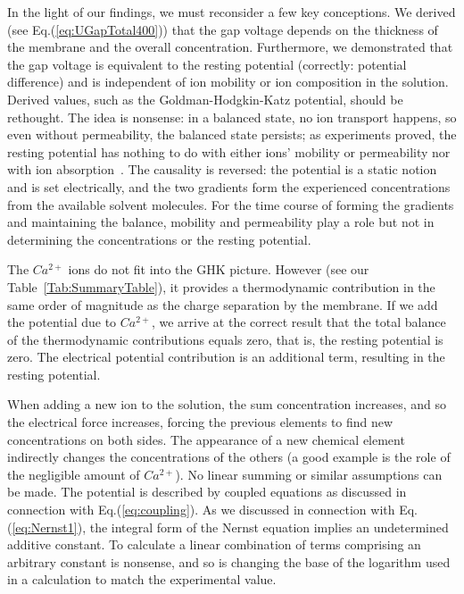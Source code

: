 In the light of our findings, we must reconsider a few key conceptions. We derived (see Eq.(\ref{eq:UGapTotal400})) that the gap voltage depends on the thickness of the membrane and the overall concentration. 
Furthermore, we demonstrated that the gap voltage is equivalent to the resting potential (correctly: potential difference) and is independent of ion mobility or ion composition in the solution.
Derived values, such as the Goldman-Hodgkin-Katz potential, should be rethought. The idea is nonsense: in a balanced state, no ion transport happens, so even without permeability, the balanced state persists;  as experiments proved, the resting potential has nothing to do with either ions' mobility or permeability nor with ion absorption~\cite{Hodgkin-HuxleyAdsorption:2021}.
The causality is reversed: the potential is a static notion and is set electrically, and
the two gradients form the experienced concentrations from the available solvent molecules.
For the time course of forming the gradients and maintaining the balance, mobility and permeability play a role but not in determining the concentrations or the resting potential.

The $Ca^{2+}$ ions do not fit into the GHK picture. However (see our Table~\ref{Tab:SummaryTable}), it provides a thermodynamic contribution in the
same order of magnitude as the charge separation by the membrane. If we add
the potential due to $Ca^{2+}$, we arrive at the correct result that the total balance of the thermodynamic contributions equals zero, that is, the resting potential is zero. The electrical potential contribution is an additional term, resulting in the resting potential.


When adding a new ion to the solution, the sum concentration
increases, and so the electrical force increases, forcing the previous 
elements to find new concentrations on both sides.
The appearance of a new chemical element indirectly changes the concentrations of the others (a good example is the role of the negligible amount of $Ca^{2+}$). No linear summing or similar assumptions can be made. The potential is described by coupled equations as discussed in connection with Eq.(\ref{eq:coupling}).
As we discussed in connection with Eq.(\ref{eq:Nernst1}), the integral form of the Nernst equation implies an undetermined additive constant. To calculate 
a linear combination of terms comprising an arbitrary constant is nonsense,
and so is changing the base of the logarithm used in a calculation to match
the experimental value.

